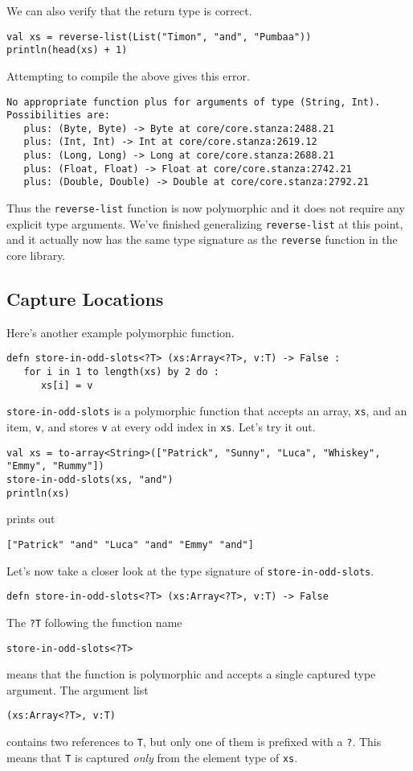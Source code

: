 \documentclass[10pt,oneside]{book}
\begin{document}
We can also verify that the return type is correct.
\begin{lstlisting}
val xs = reverse-list(List("Timon", "and", "Pumbaa"))
println(head(xs) + 1)
\end{lstlisting}
Attempting to compile the above gives this error.
\begin{lstlisting}
No appropriate function plus for arguments of type (String, Int). 
Possibilities are:
   plus: (Byte, Byte) -> Byte at core/core.stanza:2488.21
   plus: (Int, Int) -> Int at core/core.stanza:2619.12
   plus: (Long, Long) -> Long at core/core.stanza:2688.21
   plus: (Float, Float) -> Float at core/core.stanza:2742.21
   plus: (Double, Double) -> Double at core/core.stanza:2792.21
\end{lstlisting}

Thus the \texttt{\frenchspacing reverse-list} function is now polymorphic and it does not require any explicit type arguments. We've finished generalizing \texttt{\frenchspacing reverse-list} at this point, and it actually now has the same type signature as the \texttt{\frenchspacing reverse} function in the core library.

\subsection*{Capture Locations}
Here's another example polymorphic function.
\begin{lstlisting}
defn store-in-odd-slots<?T> (xs:Array<?T>, v:T) -> False :
   for i in 1 to length(xs) by 2 do :
      xs[i] = v
\end{lstlisting}
\texttt{\frenchspacing store-in-odd-slots} is a polymorphic function that accepts an array, \texttt{\frenchspacing xs}, and an item, \texttt{\frenchspacing v}, and stores \texttt{\frenchspacing v} at every odd index in \texttt{\frenchspacing xs}. Let's try it out.
\begin{lstlisting}
val xs = to-array<String>(["Patrick", "Sunny", "Luca", "Whiskey", "Emmy", "Rummy"])
store-in-odd-slots(xs, "and")
println(xs)
\end{lstlisting}
prints out
\begin{lstlisting}
["Patrick" "and" "Luca" "and" "Emmy" "and"]
\end{lstlisting}

Let's now take a closer look at the type signature of \texttt{\frenchspacing store-in-odd-slots}.
\begin{lstlisting}
defn store-in-odd-slots<?T> (xs:Array<?T>, v:T) -> False
\end{lstlisting}
The \texttt{\frenchspacing ?T} following the function name
\begin{lstlisting}
store-in-odd-slots<?T>
\end{lstlisting}
means that the function is polymorphic and accepts a single captured type argument. The argument list
\begin{lstlisting}
(xs:Array<?T>, v:T)
\end{lstlisting}
contains two references to \texttt{\frenchspacing T}, but only one of them is prefixed with a \texttt{\frenchspacing ?}. This means that \texttt{\frenchspacing T} is captured {\em only} from the element type of \texttt{\frenchspacing xs}. 
\end{document}
